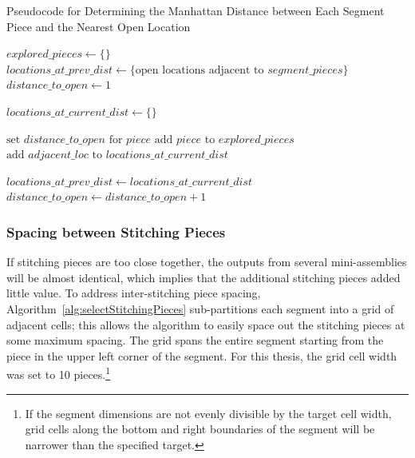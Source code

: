 \begin{algorithm}[tb]
\caption{Pseudocode for Determining the Manhattan Distance between Each Segment Piece and the Nearest Open Location}\label{alg:findDistanceToOpen}
\begin{algorithmic}[1]
    \State $explored\_pieces \gets \{ \}$
    \State $locations\_at\_prev\_dist \gets \{ \text{open locations adjacent to } segment\_pieces \}$
    \State $distance\_to\_open \gets 1$
\item[]
     \label{op:distanceRoundWhileLoop}
        \State $locations\_at\_current\_dist \gets \{ \}$
\item[]
        		
        			\State $\text{set } distance\_to\_open \text{ for } piece$
        			\State $\text{add } piece \text{ to } explored\_pieces$
        			\State $\text{add } adjacent\_loc \text{ to } locations\_at\_current\_dist$
        		\EndIf
        	\EndFor
        \EndFor
\item[]
    \State $locations\_at\_prev\_dist \gets locations\_at\_current\_dist$
    \State $distance\_to\_open \gets distance\_to\_open + 1$
    \EndWhile
\EndProcedure
\end{algorithmic}
\end{algorithm}


\subsubsection{Spacing between Stitching Pieces}\label{sec:spacingBetweenStitchingPieces}

If stitching pieces are too close together, the outputs from several mini-assemblies will be almost identical, which implies that the additional stitching pieces added little value.  To address inter-stitching piece spacing, Algorithm~\ref{alg:selectStitchingPieces} sub-partitions each segment into a grid of adjacent cells; this allows the algorithm to easily space out the stitching pieces at some maximum spacing.  The grid spans the entire segment starting from the piece in the upper left corner of the segment.  For this thesis, the grid cell width was set to 10 pieces.\footnote{If the segment dimensions are not evenly divisible by the target cell width, grid cells along the bottom and right boundaries of the segment will be narrower than the specified target.} 


